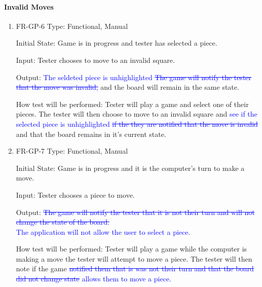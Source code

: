 \documentclass[12pt, titlepage]{article}
\begin{document}
\paragraph{Invalid Moves}
\begin{enumerate}
    \item{FR-GP-6}
    Type: Functional, Manual
    
    Initial State: Game is in progress and tester has selected a piece.
    					
    Input: Tester chooses to move to an invalid square.
    					
    Output: \textcolor{blue}{The seldeted piece is unhighlighted\sout{ The game will notify the tester that the move was invalid,}} and the board will remain in the same state.
    					
    How test will be performed: Tester will play a game and select one of their pieces. The tester will then choose to move to an invalid square and \textcolor{blue}{see if the selected piece is unhighlighted \sout{ if the they are notified that the move is invalid}} and that the board remains in it's current state.
    \item{FR-GP-7}
    Type: Functional, Manual
    
    Initial State: Game is in progress and it is the computer's turn to make a move.
    					
    Input: Tester chooses a piece to move.
    					
    Output: \textcolor{blue}{\sout{The game will notify the tester that it is not their turn and will not change the state of the board.}\\
    The application will not allow the user to select a piece.}
    					
    How test will be performed: Tester will play a game while the computer is making a move the tester will attempt to move a piece. The tester will then note if the game \textcolor{blue}{\sout{notified them that is was not their turn and that the board did not change state} allows them to move a piece.}
\end{enumerate}
\end{document}
